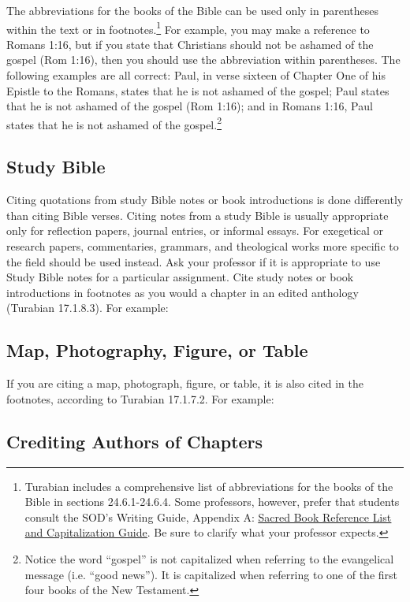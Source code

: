 \documentclass[raggedright]{turabian-researchpaper}
\newcommand*{\bluehref}[2]{\href{#1}{\color{blue}\underline{#2}}}
\begin{document}
The abbreviations for the books of the Bible can be used only in parentheses
within the text or in footnotes.\footnote{Turabian includes a comprehensive list
of abbreviations for the books of the Bible in sections 24.6.1-24.6.4. Some
professors, however, prefer that students consult the SOD's Writing Guide,
Appendix A:
\bluehref{http://www.liberty.edu/media/1162/2015_writingguide/SoD_Writing_Guide_081215.docx}{Sacred
Book Reference List and Capitalization Guide}. Be sure to clarify what your
professor expects.} For example, you may make a reference to Romans 1:16, but if
you state that Christians should not be ashamed of the gospel (Rom 1:16), then
you should use the abbreviation within parentheses. The following examples are
all correct: Paul, in verse sixteen of Chapter One of his Epistle to the Romans,
states that he is not ashamed of the gospel; Paul states that he is not ashamed
of the gospel (Rom 1:16); and in Romans 1:16, Paul states that he is not ashamed
of the gospel.\footnote{Notice the word ``gospel'' is not capitalized when
referring to the evangelical message (i.e. ``good news''). It is capitalized
when referring to one of the first four books of the New Testament.}

\subsection{Study Bible}

Citing quotations from study Bible notes or book introductions is done
differently than citing Bible verses. Citing notes from a study Bible is usually
appropriate only for reflection papers, journal entries, or informal essays. For
exegetical or research papers, commentaries, grammars, and theological works
more specific to the field should be used instead. Ask your professor if it is
appropriate to use Study Bible notes for a particular assignment. Cite study
notes or book introductions in footnotes as you would a chapter in an edited
anthology (Turabian 17.1.8.3). For example:

\subsection{Map, Photography, Figure, or Table}

If you are citing a map, photograph, figure, or table, it is also cited in the
footnotes, according to Turabian 17.1.7.2. For example:

\subsection{Crediting Authors of Chapters}
\end{document}
